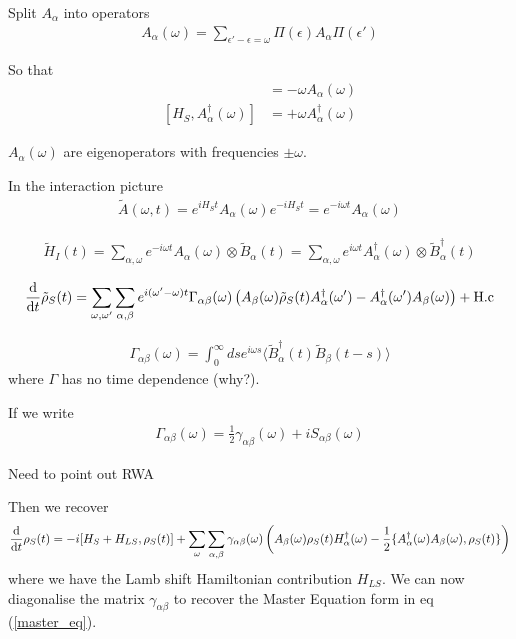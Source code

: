 Split $A_\alpha$ into operators 
\begin{align}
  A_\alpha(\omega) = \sum_{\epsilon' - \epsilon = \omega} \Pi(\epsilon)A_\alpha \Pi(\epsilon')
\end{align}

So that
\begin{align}
  [H_S, A_\alpha(\omega)] &= - \omega A_\alpha(\omega) \\
  [H_S, A^\dagger_\alpha(\omega)] &= + \omega A^\dagger_\alpha(\omega)
\end{align}

$A_\alpha(\omega)$ are eigenoperators with frequencies $\pm \omega$.

In the interaction picture
\begin{align}
  \tilde{A}(\omega, t) = e^{iH_S t}A_\alpha(\omega) e^{-iH_S t} = e^{-i\omega t} A_\alpha(\omega)
\end{align}

\begin{align}
  \tilde{H}_I(t) = \sum_{\alpha, \omega} e^{-i \omega t} A_\alpha(\omega)\otimes \tilde{B}_\alpha(t) = \sum_{\alpha, \omega} e^{i \omega t} A^\dagger_\alpha(\omega)\otimes \tilde{B}^\dagger_\alpha(t)
\end{align}

\begin{align}
  \frac{\mathrm{d}}{\mathrm{d}t} \tilde{\rho}_S(t) = \sum_{\omega, \omega'} \sum_{\alpha, \beta} e^{i(\omega'-\omega)t} \Gamma_{\alpha\beta}(\omega)\left(A_\beta(\omega)\tilde{\rho}_S(t)A^\dagger_\alpha(\omega') - A^\dagger_\alpha(\omega')A_\beta(\omega)\right) + \text{H.c}
\end{align}

\begin{align}
  \Gamma_{\alpha\beta}(\omega) = \int_0^\infty ds e^{i\omega s} \langle \tilde{B}_\alpha^\dagger(t) \tilde{B}_\beta(t-s) \rangle
\end{align}
where $\Gamma$ has no time dependence (why?).

If we write
\begin{align}
  \Gamma_{\alpha \beta}(\omega) = \frac{1}{2}\gamma_{\alpha\beta}(\omega) + i S_{\alpha\beta}(\omega)
\end{align}


Need to point out RWA

Then we recover
\begin{align}
  \frac{\mathrm{d}}{\mathrm{d}t} \rho_S(t) = -i[H_S + H_{LS}, \rho_S(t) ] + \sum_\omega \sum_{\alpha, \beta} \gamma_{\alpha\beta}(\omega)\left(A_\beta(\omega)\rho_S(t)H_\alpha^\dagger(\omega) - \frac{1}{2}\{A^\dagger_\alpha(\omega)A_\beta(\omega), \rho_S(t)\} \right)
\end{align}
where we have the Lamb shift Hamiltonian contribution $H_{LS}$. We can now diagonalise the matrix $\gamma_{\alpha\beta}$ to recover the Master Equation form in eq (\ref{master_eq}).


